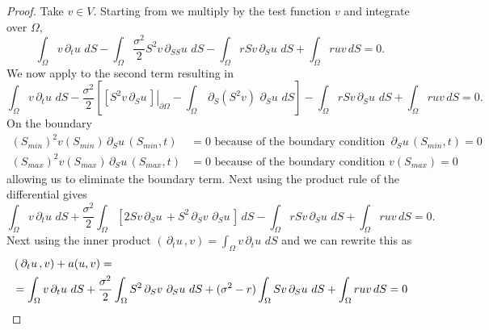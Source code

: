 \documentclass{article}
\newcommand{\argwrapsquare}[1]{\left[#1\right]}
\newcommand{\intS}[1]{\ensuremath{\int_{\Omega}#1 \, dS}}
\newcommand{\intSlong}[1]{\intS{\argwrapsquare{#1}}}
\newcommand{\darg}[2]{\ensuremath{\, \partial_{#2}#1} \, }
\newcommand{\dt}[1]{\ensuremath{\darg{#1}{t}}}
\newcommand{\dS}[1]{\ensuremath{\darg{#1}{S}}}
\newcommand{\dSS}[1]{\ensuremath{\darg{#1}{SS}}}
\newcommand{\dtu}{\dt{u}}
\newcommand{\dSu}{\dS{u}}
\newcommand{\dSSu}{\dSS{u}}
\newcommand{\dSv}{\dS{v}}
\newcommand{\sigmafrac}{\ensuremath{\frac{\sigma^2}{2}}}
\newcommand{\aform}[2]{\ensuremath{\sigmafrac \intS{S^2 \dS{#2} \dS{#1}} + (\sigma^2 - r) \intS{S #2 \dS{#1}} + \intS{r  #1  #2}}}
\newcommand{\auv}{\aform{u}{v}}
\begin{document}
\begin{proof}
    Take $v \in V$. Starting from  we multiply by the test function $v$ and integrate over $\Omega$,
    \begin{equation*}
        \intS{v \dtu} - \intS{\sigmafrac S^2  v  \dSSu } - \intS{r S v \dSu} + \intS{r  u  v} = 0.
    \end{equation*}
    We now apply  to the second term resulting in
    \begin{equation*}
        \intS{v \dtu} - \sigmafrac \left[ \left. \left[S^2 v \dSu \right] \right|_{\partial\Omega} - \intS{\dS{(S^2v)} \dSu}\right] - \intS{r S v \dSu} + \intS{r  u  v} = 0.
    \end{equation*}
    On the boundary
    \begin{align*}
        (S_{min})^2 v(S_{min}) \dSu(S_{min}, t) &= 0 \text{ because of the boundary condition } \dSu(S_{min}, t) = 0\\
        (S_{max})^2 v(S_{max}) \dSu(S_{max}, t) &= 0 \text{ because of the boundary condition } v(S_{max}) = 0
    \end{align*}
    allowing us to eliminate the boundary term. Next using the product rule of the differential gives 
    \begin{equation*}
        \intS{v \dtu} + \sigmafrac \intSlong{2Sv \dSu + S^2 \dSv \dSu} - \intS{r S v \dSu} + \intS{r  u  v} = 0.
    \end{equation*}
    Next using the inner product $\left( \dtu, v\right) = \intS{v \dtu}$ and  we can rewrite this as
    \begin{align*}
    &\left( \dtu, v\right) + a(u,v) = \\
    &= \intS{v \dtu} + \auv = 0 \qedhere
    \end{align*}
    \end{proof}
\end{document}
